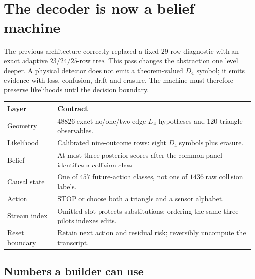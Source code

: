 \section*{The decoder is now a belief machine}

The previous architecture correctly replaced a fixed $29$-row diagnostic with an exact
adaptive $23/24/25$-row tree.  This pass changes the abstraction one level deeper.  A
physical detector does not emit a theorem-valued $D_4$ symbol; it emits evidence with
loss, confusion, drift and erasure.  The machine must therefore preserve likelihoods until
the decision boundary.

\begin{center}
\begin{tabular}{@{}p{3.0cm}p{10.5cm}@{}}
\textbf{Layer} & \textbf{Contract}\\ \hline
Geometry & $48826$ exact no/one/two-edge $D_4$ hypotheses and $120$ triangle observables.\\
Likelihood & Calibrated nine-outcome rows: eight $D_4$ symbols plus erasure.\\
Belief & At most three posterior scores after the common panel identifies a collision class.\\
Causal state & One of $457$ future-action classes, not one of $1436$ raw collision labels.\\
Action & STOP or choose both a triangle and a sensor alphabet.\\
Stream index & Omitted slot protects substitutions; ordering the same three pilots indexes edits.\\
Reset boundary & Retain next action and residual risk; reversibly uncompute the transcript.\\
\end{tabular}
\end{center}

\subsection*{Numbers a builder can use}

